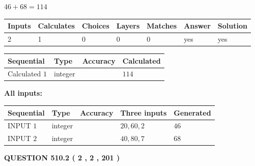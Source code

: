 \documentclass[12pt]{article}
\begin{document}
 

$ %
46 +  %
68=   %
114$
 
 
\noindent{}
 
 

 
   
   
   
   
\noindent\begin{tabular}{|l|l|l|l|l|l|l|}
 \hline
Inputs & Calculates & Choices & Layers & Matches & Answer & Solution \\ \hline
 2  & 
 1  & 
 0
  & 
 0  & 
 0  & 
  yes & 
  yes 
  \\ \hline
 \end{tabular}
   
   
   
   
\noindent{}
   
   
  
  
\noindent\begin{tabular}{|l|l|l|l|}
\hline
 Sequential & Type & Accuracy & Calculated \\ 
\hline
 
 
  Calculated $  1 $ & integer &  & 
  $ 114 $ 
 \\  \hline  
 \end{tabular}
   
   
   
   
\noindent\vspace{0.1in}\hspace{-0.08in} {\textbf{\Large{All inputs: }}}
   
   
  
  
\noindent\begin{tabular}{|l|l|l|l|l|}
\hline
 Sequential & Type & Accuracy & Three inputs & Generated \\ 
\hline
 
 
  INPUT $  1 $ & integer &  & $
 20
 , 
 60
 , 
 2
 $ & $ 46 $ 
 \\  \hline  
 
 
  INPUT $  2 $ & integer &  & $
 40
 , 
 80
 , 
 7
 $ & $ 68 $ 
 \\  \hline  
 \end{tabular}
   
   
  
\vspace{0.2in}
  
{\textbf{\Large{QUESTION
510.2 
 ( 2 , 2 , 201 )
}}}
  
\end{document}
